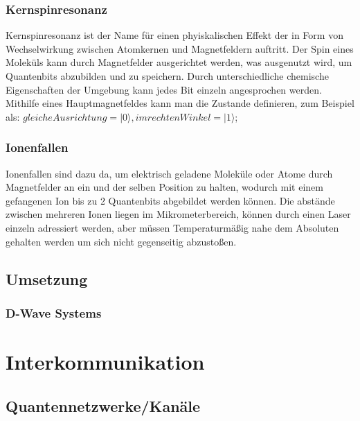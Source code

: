 \subsubsection{Kernspinresonanz}
\label{sec:kernspinresonanz}

Kernspinresonanz ist der Name für einen phyiskalischen Effekt der in Form von Wechselwirkung zwischen Atomkernen und Magnetfeldern auftritt. Der Spin eines Moleküls kann durch Magnetfelder ausgerichtet werden, was ausgenutzt wird, um Quantenbits abzubilden und zu speichern. Durch unterschiedliche chemische Eigenschaften der Umgebung kann jedes Bit einzeln angesprochen werden. Mithilfe eines Hauptmagnetfeldes kann man die Zustande definieren, zum Beispiel als: $gleiche Ausrichtung = |0\rangle, im rechten Winkel = |1\rangle$;

\subsubsection{Ionenfallen}
\label{sec:ionenfallen}

Ionenfallen sind dazu da, um elektrisch geladene Moleküle oder Atome durch Magnetfelder an ein und der selben Position zu halten, wodurch mit einem gefangenen Ion bis zu 2 Quantenbits abgebildet werden können. Die abstände zwischen mehreren Ionen liegen im Mikrometerbereich, können durch einen Laser einzeln adressiert werden, aber müssen Temperaturmäßig nahe dem Absoluten gehalten werden um sich nicht gegenseitig abzustoßen.

\subsection{Umsetzung}
\label{sec:umsetzung}

\subsubsection{D-Wave Systems}
\label{sec:dwave}





\section{Interkommunikation}
\label{sec:interkommunikation}

\subsection{Quantennetzwerke/Kanäle}
\label{sec:Quantennetzwerke/Kanale}


